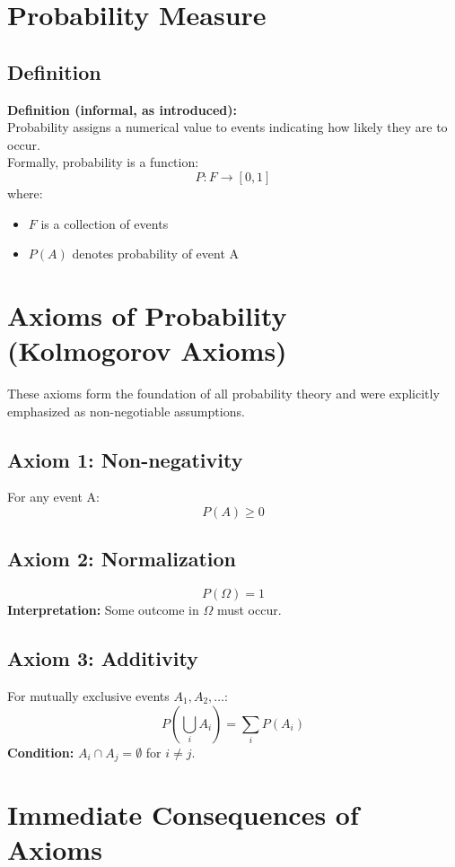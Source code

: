 \documentclass[11pt]{article}
\begin{document}
\section{Probability Measure}

\subsection{Definition}
\textbf{Definition (informal, as introduced):} \\
Probability assigns a numerical value to events indicating how likely they are to occur. \\
Formally, probability is a function:
\[ P : F \to [0, 1] \]
where:
\begin{itemize}
    \item $F$ is a collection of events
    \item $P(A)$ denotes probability of event A
\end{itemize}

\section{Axioms of Probability (Kolmogorov Axioms)}
These axioms form the foundation of all probability theory and were explicitly emphasized as non-negotiable assumptions.

\subsection{Axiom 1: Non-negativity}
For any event A:
\[ P(A) \ge 0 \]

\subsection{Axiom 2: Normalization}
\[ P(\Omega) = 1 \]
\textbf{Interpretation:} Some outcome in $\Omega$ must occur.

\subsection{Axiom 3: Additivity}
For mutually exclusive events $A_1, A_2, \dots$:
\[ P\left(\bigcup_i A_i\right) = \sum_i P(A_i) \]
\textbf{Condition:} $A_i \cap A_j = \emptyset$ for $i \neq j$.

\section{Immediate Consequences of Axioms}
\end{document}
